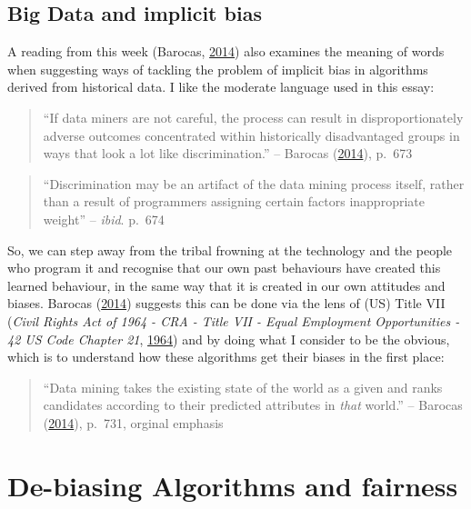 \documentclass[
]{book}
\begin{document}
\hypertarget{big-data-and-implicit-bias}{%
\subsection{Big Data and implicit bias}\label{big-data-and-implicit-bias}}

A reading from this week (Barocas, \protect\hyperlink{ref-Barocas2014}{2014}) also examines the meaning of words when suggesting ways of tackling the problem of implicit bias in algorithms derived from historical data. I like the moderate language used in this essay:

\begin{quote}
``If data miners are not careful, the process can result in disproportionately adverse outcomes concentrated within historically disadvantaged groups in ways that look a lot like discrimination.'' -- Barocas (\protect\hyperlink{ref-Barocas2014}{2014}), p.~673
\end{quote}

\begin{quote}
``Discrimination may be an artifact of the data mining process itself, rather than a result of programmers assigning certain factors inappropriate weight'' -- \emph{ibid}. p.~674
\end{quote}

So, we can step away from the tribal frowning at the technology and the people who program it and recognise that our own past behaviours have created this learned behaviour, in the same way that it is created in our own attitudes and biases. Barocas (\protect\hyperlink{ref-Barocas2014}{2014}) suggests this can be done via the lens of (US) Title VII (\emph{Civil Rights Act of 1964 - CRA - Title VII - Equal Employment Opportunities - 42 US Code Chapter 21}, \protect\hyperlink{ref-TitleVii1964}{1964}) and by doing what I consider to be the obvious, which is to understand how these algorithms get their biases in the first place:

\begin{quote}
``Data mining takes the existing state of the world as a given and ranks candidates according to their predicted attributes in \emph{that} world.'' -- Barocas (\protect\hyperlink{ref-Barocas2014}{2014}), p.~731, orginal emphasis
\end{quote}

\hypertarget{de-biasing-algorithms-and-fairness}{%
\section{De-biasing Algorithms and fairness}\label{de-biasing-algorithms-and-fairness}}
\end{document}
